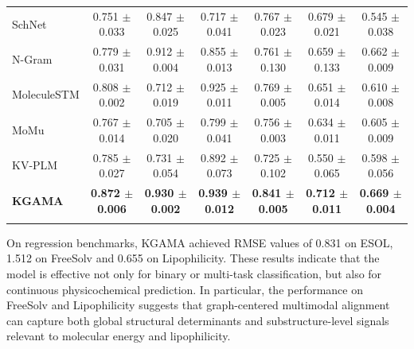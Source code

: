 \documentclass[webpdf,contemporary,large]{oup-authoring-template}%
\begin{document}
\begin{table}[t]
\begin{tabular*}{\textwidth}{@{\extracolsep{\fill}}lcccccc@{\extracolsep{\fill}}}
SchNet & 0.751 $\pm$ 0.033 & 0.847 $\pm$ 0.025 & 0.717 $\pm$ 0.041 & 0.767 $\pm$ 0.023 & 0.679 $\pm$ 0.021 & 0.545 $\pm$ 0.038 \\
N-Gram & 0.779 $\pm$ 0.031 & 0.912 $\pm$ 0.004 & 0.855 $\pm$ 0.013 & 0.761 $\pm$ 0.130 & 0.659 $\pm$ 0.133 & 0.662 $\pm$ 0.009 \\
MoleculeSTM & 0.808 $\pm$ 0.002 & 0.712 $\pm$ 0.019 & 0.925 $\pm$ 0.011 & 0.769 $\pm$ 0.005 & 0.651 $\pm$ 0.014 & 0.610 $\pm$ 0.008 \\
MoMu & 0.767 $\pm$ 0.014 & 0.705 $\pm$ 0.020 & 0.799 $\pm$ 0.041 & 0.756 $\pm$ 0.003 & 0.634 $\pm$ 0.011 & 0.605 $\pm$ 0.009 \\
KV-PLM & 0.785 $\pm$ 0.027 & 0.731 $\pm$ 0.054 & 0.892 $\pm$ 0.073 & 0.725 $\pm$ 0.102 & 0.550 $\pm$ 0.065 & 0.598 $\pm$ 0.056 \\
\textbf{KGAMA} & \textbf{0.872 $\pm$ 0.006} & \textbf{0.930 $\pm$ 0.002} & \textbf{0.939 $\pm$ 0.012} & \textbf{0.841 $\pm$ 0.005} & \textbf{0.712 $\pm$ 0.011} & \textbf{0.669 $\pm$ 0.004} \\
\botrule
\end{tabular*}
\end{table}

On regression benchmarks, KGAMA achieved RMSE values of 0.831 on ESOL, 1.512 on FreeSolv and 0.655 on Lipophilicity. These results indicate that the model is effective not only for binary or multi-task classification, but also for continuous physicochemical prediction. In particular, the performance on FreeSolv and Lipophilicity suggests that graph-centered multimodal alignment can capture both global structural determinants and substructure-level signals relevant to molecular energy and lipophilicity.
\end{document}
